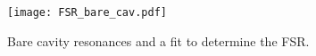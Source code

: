 \begin{figure}[H]
\centering
\texttt{[image: FSR\_bare\_cav.pdf]}
\caption{Bare cavity resonances and a fit to determine the FSR.}
\label{fig:FSR_bare_cavity}
\end{figure}